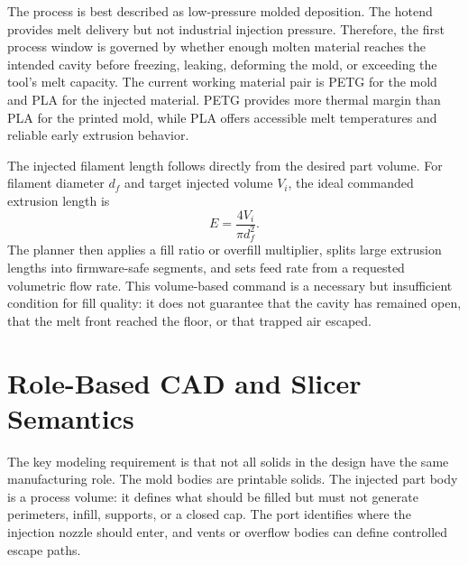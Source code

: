 \documentclass[conference]{IEEEtran}
\begin{document}
The process is best described as low-pressure molded deposition. The hotend provides melt delivery but not industrial injection pressure. Therefore, the first process window is governed by whether enough molten material reaches the intended cavity before freezing, leaking, deforming the mold, or exceeding the tool's melt capacity. The current working material pair is PETG for the mold and PLA for the injected material. PETG provides more thermal margin than PLA for the printed mold, while PLA offers accessible melt temperatures and reliable early extrusion behavior.

The injected filament length follows directly from the desired part volume. For filament diameter $d_f$ and target injected volume $V_i$, the ideal commanded extrusion length is
\begin{equation}
E = \frac{4 V_i}{\pi d_f^2}.
\label{eq:extrusion}
\end{equation}
The planner then applies a fill ratio or overfill multiplier, splits large extrusion lengths into firmware-safe segments, and sets feed rate from a requested volumetric flow rate. This volume-based command is a necessary but insufficient condition for fill quality: it does not guarantee that the cavity has remained open, that the melt front reached the floor, or that trapped air escaped.

\section{Role-Based CAD and Slicer Semantics}
The key modeling requirement is that not all solids in the design have the same manufacturing role. The mold bodies are printable solids. The injected part body is a process volume: it defines what should be filled but must not generate perimeters, infill, supports, or a closed cap. The port identifies where the injection nozzle should enter, and vents or overflow bodies can define controlled escape paths.
\end{document}
